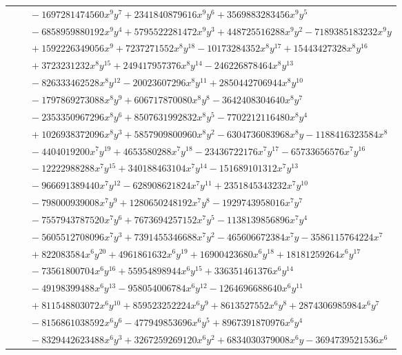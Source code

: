\documentclass[11pt]{article}
\begin{document}
\begin{longtable}{@{}ll@{}}
 & $\quad -1697281474560x^{9}y^{7}+2341840879616x^{9}y^{6}+3569883283456x^{9}y^{5}$\\
 & $\quad -6858959880192x^{9}y^{4}+5795522281472x^{9}y^{3}+448725516288x^{9}y^{2}-7189385183232x^{9}y$\\
 & $\quad +1592226349056x^{9}+7237271552x^{8}y^{18}-10173284352x^{8}y^{17}+15443427328x^{8}y^{16}$\\
 & $\quad +3723231232x^{8}y^{15}+249417957376x^{8}y^{14}-246226878464x^{8}y^{13}$\\
 & $\quad -826333462528x^{8}y^{12}-20023607296x^{8}y^{11}+2850442706944x^{8}y^{10}$\\
 & $\quad -1797869273088x^{8}y^{9}+606717870080x^{8}y^{8}-3642408304640x^{8}y^{7}$\\
 & $\quad -2353350967296x^{8}y^{6}+8507631992832x^{8}y^{5}-7702212116480x^{8}y^{4}$\\
 & $\quad +1026938372096x^{8}y^{3}+5857909800960x^{8}y^{2}-6304736083968x^{8}y-1188416323584x^{8}$\\
 & $\quad -4404019200x^{7}y^{19}+4653580288x^{7}y^{18}-23436722176x^{7}y^{17}-65733656576x^{7}y^{16}$\\
 & $\quad -12222988288x^{7}y^{15}+340188463104x^{7}y^{14}-151689101312x^{7}y^{13}$\\
 & $\quad -966691389440x^{7}y^{12}-628908621824x^{7}y^{11}+2351845343232x^{7}y^{10}$\\
 & $\quad -798000939008x^{7}y^{9}+1280650248192x^{7}y^{8}-1929743958016x^{7}y^{7}$\\
 & $\quad -7557943787520x^{7}y^{6}+7673694257152x^{7}y^{5}-1138139856896x^{7}y^{4}$\\
 & $\quad -5605512708096x^{7}y^{3}+7391455346688x^{7}y^{2}-465606672384x^{7}y-3586115764224x^{7}$\\
 & $\quad +822083584x^{6}y^{20}+4961861632x^{6}y^{19}+16900423680x^{6}y^{18}+18181259264x^{6}y^{17}$\\
 & $\quad -73561800704x^{6}y^{16}+55954898944x^{6}y^{15}+336351461376x^{6}y^{14}$\\
 & $\quad -49198399488x^{6}y^{13}-958054006784x^{6}y^{12}-1264696688640x^{6}y^{11}$\\
 & $\quad +811548803072x^{6}y^{10}+859523252224x^{6}y^{9}+8613527552x^{6}y^{8}+2874306985984x^{6}y^{7}$\\
 & $\quad -8156861038592x^{6}y^{6}-477949853696x^{6}y^{5}+8967391870976x^{6}y^{4}$\\
 & $\quad -8329442623488x^{6}y^{3}+3267259269120x^{6}y^{2}+6834030379008x^{6}y-3694739521536x^{6}$\\

\end{longtable}
\end{document}
